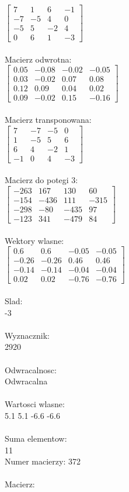 \documentclass[a4paper,12pt]{article}
\begin{document}
$\begin{bmatrix} 7&1&6&-1\\-7&-5&4&0\\-5&5&-2&4\\0&6&1&-3 \end{bmatrix}$
\\
\\
Macierz odwrotna:\\

$\begin{bmatrix} 0.05&-0.08&-0.02&-0.05\\0.03&-0.02&0.07&0.08\\0.12&0.09&0.04&0.02\\0.09&-0.02&0.15&-0.16 \end{bmatrix}$
\\
\\
Macierz transponowana:\\

$\begin{bmatrix} 7&-7&-5&0\\1&-5&5&6\\6&4&-2&1\\-1&0&4&-3 \end{bmatrix}$
\\
\\
Macierz do potegi 3:\\

$\begin{bmatrix} -263&167&130&60\\-154&-436&111&-315\\-298&-80&-435&97\\-123&341&-479&84 \end{bmatrix}$
\\
\\
Wektory wlasne:\\

$\begin{bmatrix} 0.6&0.6&-0.05&-0.05\\-0.26&-0.26&0.46&0.46\\-0.14&-0.14&-0.04&-0.04\\0.02&0.02&-0.76&-0.76 \end{bmatrix}$
\\
\\
Slad:\\
-3
\\
\\
Wyznacznik:\\
2920
\\
\\
Odwracalnosc:\\
Odwracalna
\\
\\
Wartosci wlasne:\\
5.1 5.1 -6.6 -6.6
\\
\\
Suma elementow:\\
11
\\
\newpage
Numer macierzy:
372
\\
\\
Macierz:\\
\end{document}
